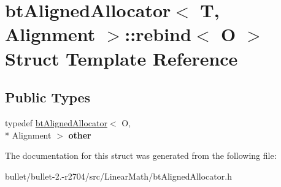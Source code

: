 \hypertarget{structbt_aligned_allocator_1_1rebind}{\section{bt\+Aligned\+Allocator$<$ T, Alignment $>$\+:\+:rebind$<$ O $>$ Struct Template Reference}
\label{structbt_aligned_allocator_1_1rebind}
}
\subsection*{Public Types}
\begin{DoxyCompactItemize}
\item 
\hypertarget{structbt_aligned_allocator_1_1rebind_af003f7f5b71933b2a46fada7e14b5573}{typedef \hyperlink{classbt_aligned_allocator}{bt\+Aligned\+Allocator}$<$ O, \\*
Alignment $>$ {\bfseries other}}\label{structbt_aligned_allocator_1_1rebind_af003f7f5b71933b2a46fada7e14b5573}

\end{DoxyCompactItemize}


The documentation for this struct was generated from the following file\+:\begin{DoxyCompactItemize}
\item 
bullet/bullet-\/2.-\/r2704/src/\+Linear\+Math/bt\+Aligned\+Allocator.\+h\end{DoxyCompactItemize}
